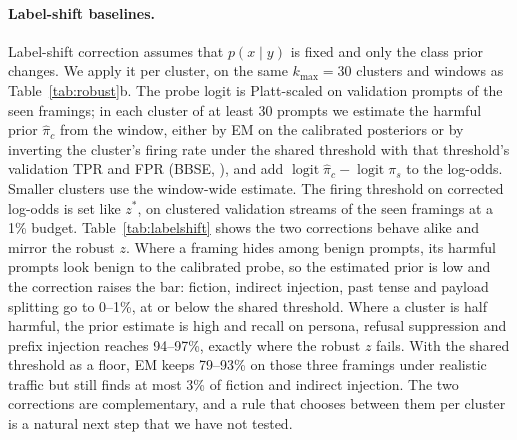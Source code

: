 \documentclass[11pt]{article}
\begin{document}
\paragraph{Label-shift baselines.}
Label-shift correction assumes that $p(x\mid y)$ is fixed and only the class prior changes. We apply it per cluster, on the same $k_{\max}{=}30$ clusters and windows as Table~\ref{tab:robust}b. The probe logit is Platt-scaled on validation prompts of the seen framings; in each cluster of at least 30 prompts we estimate the harmful prior $\hat\pi_c$ from the window, either by EM on the calibrated posteriors \citep{saerens2002adjusting} or by inverting the cluster's firing rate under the shared threshold with that threshold's validation TPR and FPR (BBSE, \citealp{lipton2018bbse}), and add $\operatorname{logit}\hat\pi_c-\operatorname{logit}\pi_s$ to the log-odds. Smaller clusters use the window-wide estimate. The firing threshold on corrected log-odds is set like $z^*$, on clustered validation streams of the seen framings at a 1\% budget. Table~\ref{tab:labelshift} shows the two corrections behave alike and mirror the robust $z$. Where a framing hides among benign prompts, its harmful prompts look benign to the calibrated probe, so the estimated prior is low and the correction raises the bar: fiction, indirect injection, past tense and payload splitting go to 0--1\%, at or below the shared threshold. Where a cluster is half harmful, the prior estimate is high and recall on persona, refusal suppression and prefix injection reaches 94--97\%, exactly where the robust $z$ fails. With the shared threshold as a floor, EM keeps 79--93\% on those three framings under realistic traffic but still finds at most 3\% of fiction and indirect injection. The two corrections are complementary, and a rule that chooses between them per cluster is a natural next step that we have not tested.

\begin{table}[t]
\centering
\resizebox{\columnwidth}{!}{}
\caption{Per-cluster label-shift baselines against the shared and hybrid rules, Qwen2.5-1.5B, $k_{\max}{=}30$, same 10 windows as Table~\ref{tab:robust}b. Recall (\%); FPR averaged over 13 framings.}
\label{tab:labelshift}
\end{table}
\end{document}
